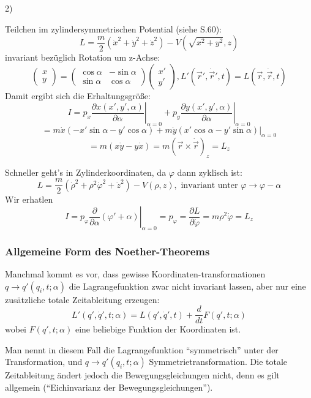 \documentclass[10pt, letterpaper]{article}
\begin{document}
2) 

Teilchen im zylindersymmetrischen Potential (siehe S.60):
\[L = \frac{m}{2}(\dot{x}^2 + \dot{y}^2 + \dot{z}^2) - V(\sqrt{x^2+y^2},z)\]
invariant bezüglich Rotation um z-Achse:
\[\begin{pmatrix} x \\ y \end{pmatrix} = \begin{pmatrix} \cos\alpha & -\sin\alpha \\ \sin\alpha & \cos\alpha \end{pmatrix} \begin{pmatrix} x' \\ y' \end{pmatrix}, L'(\vec{r}',\dot{\vec{r}}',t) = L(\vec{r},\dot{\vec{r}},t)\]
Damit ergibt sich die Erhaltungsgröße:
\[I = p_x \left.\frac{\partial x(x',y',\alpha)}{\partial \alpha}\right|_{\alpha=0} + p_y \left.\frac{\partial y(x',y',\alpha)}{\partial \alpha}\right|_{\alpha=0}\]
\[= m\dot{x}(-x'\sin\alpha-y'\cos\alpha) + m\dot{y}(x'\cos\alpha-y'\sin\alpha)\Big|_{\alpha=0}\]
\[= m(x\dot{y}-y\dot{x}) = m(\vec{r}\times\dot{\vec{r}})_z = L_z\]

Schneller geht's in Zylinderkoordinaten, da $\varphi$ dann zyklisch ist:
\[L = \frac{m}{2}(\dot{\rho}^2 + \rho^2\dot{\varphi}^2 + \dot{z}^2) - V(\rho,z), \text{ invariant unter } \varphi \rightarrow \varphi-\alpha\]
Wir erhatlen
$$I = p_\varphi \left.\frac{\partial}{\partial\alpha}(\varphi'+\alpha)\right|_{\alpha=0} = p_\varphi = \frac{\partial L}{\partial\dot{\varphi}} = m\rho^2\dot{\varphi} = L_z$$




\subsubsection{Allgemeine Form des Noether-Theorems}

Manchmal kommt es vor, dass gewisse Koordinaten-transformationen $q \to q'(q_i,t;\alpha)$ die Lagrangefunktion zwar nicht invariant lassen, aber nur eine zusätzliche totale Zeitableitung erzeugen:
\[L'(q',\dot{q}',t;\alpha) = L(q',\dot{q}',t) + \frac{d}{dt}F(q',t;\alpha)\]
wobei $F(q',t;\alpha)$ eine beliebige Funktion der Koordinaten ist.

Man nennt in diesem Fall die Lagrangefunktion ``symmetrisch'' unter der Transformation, und $q \to q'(q_i,t;\alpha)$ Symmetrietransformation. Die totale Zeitableitung ändert jedoch die Bewegungsgleichungen nicht, denn es gilt allgemein (``Eichinvarianz der Bewegungsgleichungen'').
\end{document}
